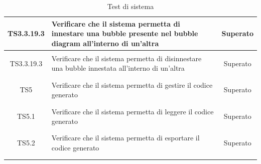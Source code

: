 \documentclass[../PianoDiQualifica.tex]{subfiles}
\begin{document}
\begin{longtable}{|c|>{\centering}p{10cm}|c|}
	
	
	\hline
	\hypertarget{TS3.3.19.3}{TS3.3.19.3} & Verificare che il sistema permetta di innestare una bubble presente nel bubble diagram all'interno di un'altra&Superato \\
	\hline
	\hypertarget{TS3.3.19.3}{TS3.3.19.3} & Verificare che il sistema permetta di disinnestare una bubble innestata all'interno di un'altra&Superato \\
	\hline
	
	\hypertarget{TS5}{TS5} & Verificare che il sistema permetta di gestire il codice generato & Superato \\
	\hline
	\hypertarget{TS5.1}{TS5.1} & Verificare che il sistema permetta di leggere il codice generato & Superato \\
	\hline
	\hypertarget{TS5.2}{TS5.2} & Verificare che il sistema permetta di esportare il codice generato & Superato \\
	\hline
\caption[Test di sistema]{Test di sistema}
\label{tabella:TestSistema}
\end{longtable}

\newpage
\end{document}
